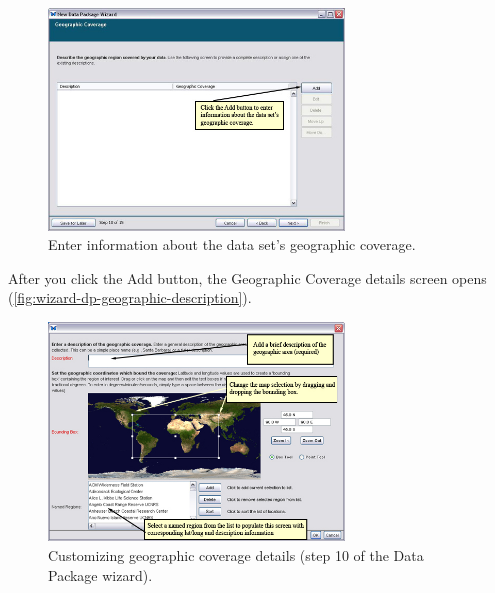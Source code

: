 \begin{figure}
  \centering
    \includegraphics[width=0.7\textwidth]{images/wizard-dp-geographic.jpg}
  \caption{Enter information about the data set's geographic coverage.}
  \label{fig:wizard-dp-geographic}
\end{figure}

After you click the Add button, the Geographic Coverage details screen
opens (\autoref{fig:wizard-dp-geographic-description}).

\begin{figure}
  \centering
    \includegraphics[width=0.7\textwidth]{images/wizard-dp-geographic-description.jpg}
  \caption{Customizing geographic coverage details (step 10 of the Data
    Package wizard).}
  \label{fig:wizard-dp-geographic-description}
\end{figure}

